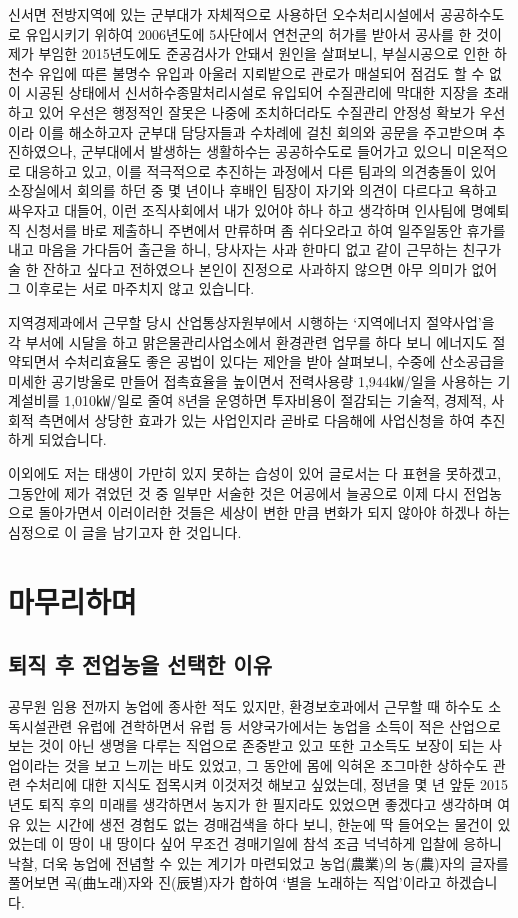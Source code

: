 \documentclass[chapter,book,openany,twoside]{oblivoir}
\begin{document}
신서면 전방지역에 있는 군부대가 자체적으로 사용하던 오수처리시설에서 공공하수도로 유입시키기 위하여 2006년도에 5사단에서 연천군의 허가를 받아서 공사를 한 것이 제가 부임한 2015년도에도 준공검사가 안돼서 원인을 살펴보니, 부실시공으로 인한 하천수 유입에 따른 불명수 유입과  아울러 지뢰밭으로 관로가 매설되어 점검도 할 수 없이 시공된 상태에서 신서하수종말처리시설로 유입되어 수질관리에 막대한 지장을 초래하고 있어 우선은 행정적인 잘못은 나중에 조치하더라도 수질관리 안정성 확보가 우선이라 이를 해소하고자 군부대 담당자들과 수차례에 걸친 회의와 공문을 주고받으며 추진하였으나, 군부대에서 발생하는 생활하수는 공공하수도로 들어가고 있으니 미온적으로 대응하고 있고, 이를 적극적으로 추진하는 과정에서 다른 팀과의 의견충돌이 있어 소장실에서 회의를 하던 중 몇 년이나 후배인 팀장이 자기와 의견이 다르다고 욕하고 싸우자고 대들어, 이런 조직사회에서 내가 있어야 하나 하고 생각하며 인사팀에 명예퇴직 신청서를 바로 제출하니 주변에서 만류하며 좀 쉬다오라고 하여 일주일동안 휴가를 내고 마음을 가다듬어 출근을 하니, 당사자는 사과 한마디 없고 같이 근무하는 친구가 술 한 잔하고 싶다고 전하였으나 본인이 진정으로 사과하지 않으면 아무 의미가 없어 그 이후로는 서로 마주치지 않고 있습니다.

지역경제과에서 근무할 당시 산업통상자원부에서 시행하는 `지역에너지 절약사업'을 각 부서에 시달을 하고 맑은물관리사업소에서 환경관련 업무를 하다 보니 에너지도 절약되면서 수처리효율도 좋은 공법이 있다는 제안을 받아 살펴보니, 수중에 산소공급을 미세한 공기방울로 만들어 접촉효율을 높이면서 전력사용량 1,944㎾/일을 사용하는 기계설비를 1,010㎾/일로 줄여 8년을 운영하면 투자비용이 절감되는 기술적, 경제적, 사회적 측면에서 상당한 효과가 있는 사업인지라 곧바로 다음해에 사업신청을 하여 추진하게 되었습니다.

이외에도 저는 태생이 가만히 있지 못하는 습성이 있어 글로서는 다 표현을 못하겠고, 그동안에 제가 겪었던 것 중 일부만 서술한 것은 어공에서 늘공으로 이제 다시 전업농으로 돌아가면서 이러이러한 것들은 세상이 변한 만큼 변화가 되지 않아야 하겠나 하는 심정으로 이 글을 남기고자 한 것입니다.

\chapter{마무리하며}

\section{퇴직 후 전업농을 선택한 이유}

공무원 임용 전까지 농업에 종사한 적도 있지만, 환경보호과에서 근무할 때 하수도 소독시설관련 유럽에 견학하면서 유럽 등 서양국가에서는 농업을 소득이 적은 산업으로 보는 것이 아닌 생명을 다루는 직업으로 존중받고 있고 또한 고소득도 보장이 되는 사업이라는 것을 보고 느끼는 바도 있었고, 그 동안에 몸에 익혀온 조그마한 상하수도 관련 수처리에 대한 지식도 접목시켜 이것저것 해보고 싶었는데, 정년을 몇 년 앞둔 2015년도 퇴직 후의 미래를 생각하면서 농지가 한 필지라도 있었으면 좋겠다고 생각하며 여유 있는 시간에 생전 경험도 없는 경매검색을 하다 보니, 한눈에 딱 들어오는 물건이 있었는데 이 땅이 내 땅이다 싶어 무조건 경매기일에 참석 조금 넉넉하게 입찰에 응하니 낙찰, 더욱 농업에 전념할 수 있는 계기가 마련되었고 농업(農業)의 농(農)자의 글자를 풀어보면 곡(曲노래)자와 진(辰별)자가 합하여 `별을 노래하는 직업'이라고 하겠습니다.
\end{document}
